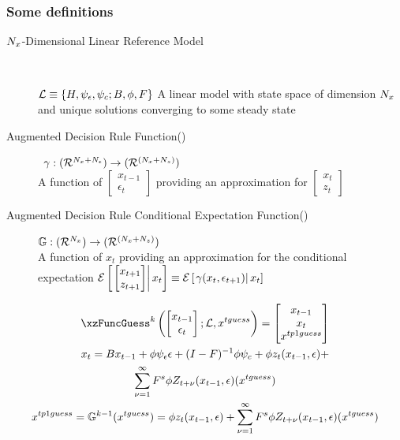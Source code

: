 \documentclass[tikz]{beamer}
\begin{document}
\begin{frame}
  \frametitle{Some definitions}

{\small

  \begin{description}
  \item[${N_x}$-Dimensional Linear Reference Model] \ 

${\mathcal{L}} \equiv {\{H,\psi_\epsilon,\psi_c;B,\phi,F\}}$ A linear model with state space of dimension
${N_x}$ and unique solutions converging 
to some steady state
  \item[Augmented Decision Rule Function(\ADR)]  \ 
${{\gamma}}: {({\mathcal{R}^{{N_x}+{N_\epsilon}}})\rightarrow ({\mathcal{R}^{({{N_x}+{N_z}})}})}$ \\
 A function of $
\begin{bmatrix}
  x_{t-1}\\\epsilon_t
\end{bmatrix}
$ providing an approximation 
for $\begin{bmatrix}
  x_t\\z_t
\end{bmatrix}$
  \item[Augmented Decision Rule Conditional Expectation Function(\ADRCE)] 

${\mathbb{G}}: {({\mathcal{R}^{{N_x}}})\rightarrow ({\mathcal{R}^{({{N_x}+{N_z}})}})}$ \\ A function of $x_t$ providing an approximation 
for the conditional expectation  
${\mathcal{E}\left [ \left . \begin{bmatrix}
  x_{t+1}\\z_{t+1}
\end{bmatrix} \right | x_t \right ]}\equiv  {\mathcal{E}\left [ \left . {{\gamma}}(x_t,\epsilon_{t+1}) \right | x_t \right ]}$

  \end{description}

}

\end{frame}




\begin{frame}

{\small
  \begin{gather}
  \xzFuncGuess^k \left (
  \begin{bmatrix}
    x_{t-1} \\\epsilon_t
  \end{bmatrix}; \linMod,\xguss
\right )=
  \begin{bmatrix}
    x_{t-1}\\ x_t\\ \xtpguss
  \end{bmatrix}\\
x_t= \sumLinPart + \sumZPartZero +\\  \sumZPartPos(\xguss)  \label{seriesForm}\\ 
\xtpguss=\XZFunc^{k-1}(\xguss) = \sumZPartZero +  \sumZPartPos(\xguss)
  \end{gather}
}
\end{frame}
\end{document}

